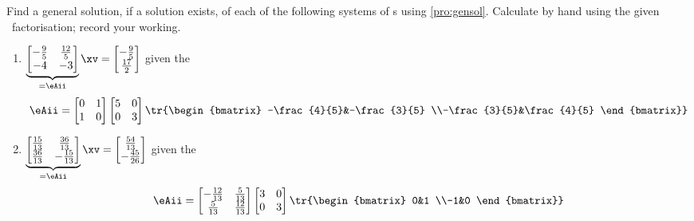 \begin{exercise} \label{ex:hsledvs} 
Find a general solution, if a solution exists, of each of the following systems of s using \autoref{pro:gensol}.
Calculate by hand using the given \svd\ factorisation; record your working.
\begin{enumerate}
\item \(\underbrace{\begin{bmatrix} -\frac{9}{5}&\frac{12}{5}
\\-4&-3 \end{bmatrix}}_{=\eAii}\xv
=\begin{bmatrix} -\frac{9}{5}
\\\frac{17}{2} \end{bmatrix}\) given the \svd
\begin{equation*}
\eAii=\begin{bmatrix} 0&1
\\1&0 \end{bmatrix}
\begin{bmatrix} 5&0
\\0&3 \end{bmatrix}
\tr{\begin{bmatrix} -\frac{4}{5}&-\frac{3}{5}
\\-\frac{3}{5}&\frac{4}{5} \end{bmatrix}}
\end{equation*}

\item \(\underbrace{\begin{bmatrix} \frac{15}{13}&\frac{36}{13}
\\\frac{36}{13}&-\frac{15}{13} \end{bmatrix}}_{=\eAii}\xv
=\begin{bmatrix} \frac{54}{13}
\\-\frac{45}{26} \end{bmatrix}\) given the \svd
\begin{equation*}
\eAii=\begin{bmatrix} -\frac{12}{13}&\frac{5}{13}
\\\frac{5}{13}&\frac{12}{13} \end{bmatrix}
\begin{bmatrix} 3&0
\\0&3 \end{bmatrix}
\tr{\begin{bmatrix} 0&1
\\-1&0 \end{bmatrix}}
\end{equation*}


\end{enumerate}
\end{exercise}
